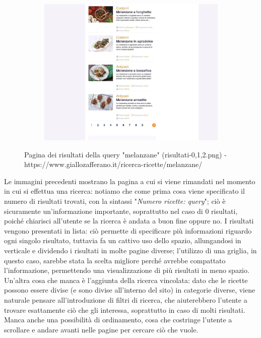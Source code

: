 \begin{figure}[h!]
\begin{subfigure}[b]{0.4\textwidth}
		\includegraphics[scale=0.1]{images/risultati/risultati-2.jpeg}
		\subcaption{}
	\end{subfigure}
	\caption{Pagina dei risultati della query "melanzane" (risultati-0,1,2.png) -\newline https://www.giallozafferano.it/ricerca-ricette/melanzane/}
	\label{fig:risultati}
\end{figure}

Le immagini precedenti mostrano la pagina a cui si viene rimandati nel momento in cui si effettua una ricerca: notiamo che come prima cosa viene specificato il numero di risultati trovati, con la sintassi "\textit{Numero ricette: query}"; ciò è sicuramente un'informazione importante, soprattutto nel caso di 0 risultati, poiché chiarisci all'utente se la ricerca è andata a buon fine oppure no.
I risultati vengono presentati in lista: ciò permette di specificare più informazioni riguardo ogni singolo risultato, tuttavia fa un cattivo uso dello spazio, allungandosi in verticale e dividendo i risultati in molte pagine diverse; l'utilizzo di una griglia, in questo caso, sarebbe stata la scelta migliore perché avrebbe compattato l'informazione, permettendo una visualizzazione di più risultati in meno spazio. 
Un'altra cosa che manca è l'aggiunta della ricerca vincolata: dato che le ricette possono essere divise (e sono divise all'interno del sito) in categorie diverse, viene naturale pensare all'introduzione di filtri di ricerca, che aiuterebbero l'utente a trovare esattamente ciò che gli interessa, soprattutto in caso di molti risultati.
Manca anche una possibilità di ordinamento, cosa che costringe l'utente a scrollare e andare avanti nelle pagine per cercare ciò che vuole. 


